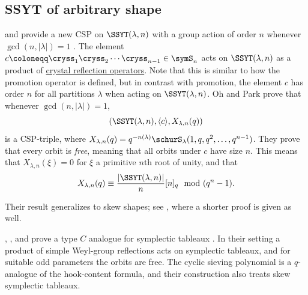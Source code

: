 \subsection[cspGeneralSSYT]{SSYT of arbitrary shape}

 and  provide a new CSP on
$\SSYT(\lambda,n)$ with a group action of order $n$ whenever
$\gcd(n,|\lambda|)=1$ \cite{OhPark2019}.
The element $c \coloneqq \cryss_1 \cryss_2 \dotsb \cryss_{n-1} \in \symS_n$
acts on $\SSYT(\lambda,n)$
as a product of \hyperref[crystalOperators]{crystal reflection operators}.
Note that this is similar to how the promotion operator is defined,
but in contrast with promotion, the element $c$ has order $n$ for all partitions $\lambda$
when acting on $\SSYT(\lambda,n)$.
Oh and Park prove that whenever $\gcd(n,|\lambda|)=1$,
\[
(\SSYT(\lambda,n), \langle c \rangle, X_{\lambda,n}(q))
\]
is a CSP-triple, where $X_{\lambda,n}(q) = q^{-n(\lambda)} \schurS_\lambda(1,q,q^2,\dotsc,q^{n-1})$.
They prove that every orbit is \emph{free}, meaning that all orbits under $c$
have size $n$. This means that $X_{\lambda,n}(\xi)=0$ for $\xi$ a primitive $n$th root of unity,
and that
\[
X_{\lambda,n}(q) \equiv \frac{|\SSYT(\lambda,n)|}{n} [n]_q \mod (q^n -1).
\]

Their result generalizes to skew shapes; see \cite{Alexandersson2023}, where a
shorter proof is given as well.

, , and 
prove a type $C$ analogue for symplectic tableaux
\cite{HenricksonStokkeWiebe2024}.  In their setting a product of simple
Weyl-group reflections acts on symplectic tableaux, and for suitable odd
parameters the orbits are free.  The cyclic sieving polynomial is a
$q$-analogue of the hook-content formula, and their construction also treats
skew symplectic tableaux.



